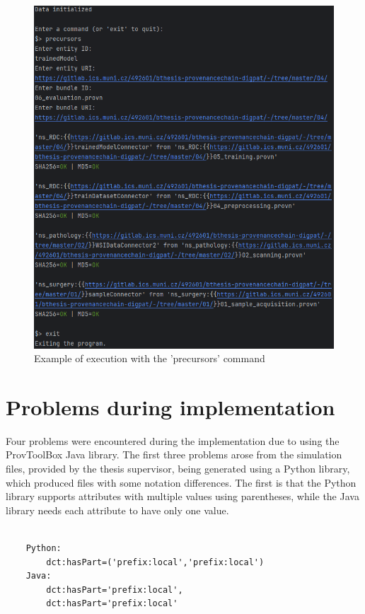 \documentclass[
  digital,     %
  oneside,     %
  nosansbold,  %
  nocolorbold, %
  lof,         %
  lot,         %
]{fithesis4}
\begin{document}
\begin{figure}[htbp]
  \begin{center}
    \includegraphics[width=12.5cm]{fithesis/images/precursor-run-slim.png}
  \end{center}
  \caption{Example of execution with the 'precursors' command}
  \label{fig:precursor-run}
\end{figure}

\section{Problems during implementation}
Four problems were encountered during the implementation due to using the ProvToolBox Java library. The first three problems arose from the simulation files, provided by the thesis supervisor, being generated using a Python library, which produced files with some notation differences. The first is that the Python library supports attributes with multiple values using parentheses, while the Java library needs each attribute to have only one value.

\begin{verbatim}

    Python: 
        dct:hasPart=('prefix:local','prefix:local')
    Java:
        dct:hasPart='prefix:local', 
        dct:hasPart='prefix:local' 
        
\end{verbatim}
\end{document}
